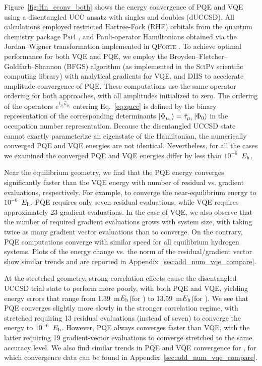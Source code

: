 \documentclass[aps,prx, reprint]{revtex4-2}
\newcommand*{\Eh}{$E_{\rm h}$\xspace}
\begin{document}
Figure~\ref{fig:Hn_econv_both} shows the energy convergence of PQE and VQE using a disentangled UCC ansatz with singles and doubles (dUCCSD).
All calculations employed restricted Hartree-Fock (RHF) orbitals from the quantum chemistry package \textsc{Psi4} \cite{smith2020psi4}, and Pauli-operator Hamiltonians obtained via the Jordan--Wigner transformation implemented in \textsc{QForte} \cite{stairqforte}.
To achieve optimal performance for both VQE and PQE, we employ the Broyden--Fletcher--Goldfarb--Shannon (BFGS) algorithm \cite{broyden1970convergence, fletcher1970new, goldfarb1970family, shanno1970conditioning}  (as implemented in the \textsc{SciPy} \cite{virtanen2020scipy} scientific computing library) with analytical gradients for VQE, and  DIIS \cite{pulay1980convergence,SCUSERIA1986236} to accelerate amplitude convergence of PQE.
These computations use the same operator ordering for both approaches, with all amplitudes initialized to zero.
The ordering of the operators $e^{t_{\mu_i} \hat{\kappa}_{\mu_i}}$ entering Eq.~\eqref{eq:qucc} is defined by the binary representation of the corresponding determinants $\ket{\Phi_{\mu_i}} = \hat{\tau}_{\mu_i} \ket{\Phi_0}$ in the occupation number representation.
Because the  disentangled UCCSD state cannot exactly parameterize an eigenstate of the Hamiltonian, the numerically converged PQE and VQE energies are not identical.
Nevertheless, for all the cases we examined the converged PQE and VQE energies differ by less than $10^{-6}$~\Eh.

Near the equilibrium geometry, we find that the PQE energy converges significantly faster than the VQE energy with number of residual vs. gradient evaluations, respectively.
For example, to converge the near-equilibrium  energy to $10^{-6}$~\Eh, PQE requires only seven residual evaluations, while VQE requires approximately 23 gradient evaluations.
In the case of VQE, we also observe that the number of required gradient evaluations grows with system size, with  taking twice as many gradient vector evaluations than  to converge.
On the contrary, PQE computations converge with similar speed for all equilibrium hydrogen systems.
Plots of the energy change vs. the norm of the residual/gradient vector show similar trends and are reported in Appendix~\ref{sec:add_num_vqe_compare}.

At the stretched geometry, strong correlation effects cause the  disentangled UCCSD trial state to perform more poorly, with both PQE and VQE, yielding energy errors that range from 1.39~m\Eh (for ) to 13.59~m\Eh (for ).
We see that PQE converges slightly more slowly in the stronger correlation regime, with stretched  requiring 13 residual evaluations (instead of seven) to converge the energy to $10^{-6}$~\Eh.
However, PQE always converges faster than VQE, with the latter requiring 19 gradient-vector evaluations to converge stretched  to the same accuracy level.
We also find similar trends in PQE and VQE convergence for , for which convergence data can be found in Appendix~\ref{sec:add_num_vqe_compare}.
\end{document}
